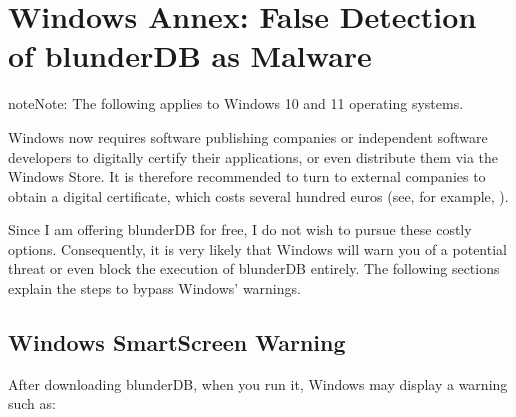 \documentclass[letterpaper,10pt,english]{sphinxmanual}
\begin{document}
\sphinxstepscope


\section{Windows Annex: False Detection of blunderDB as Malware}
\label{\detokenize{annexe_windows_securite:annexe-windows-detection-abusive-de-blunderdb-comme-logiciel-malveillant}}\label{\detokenize{annexe_windows_securite:annexe-windows-malware}}\label{\detokenize{annexe_windows_securite::doc}}
\begin{sphinxadmonition}{note}{Note:}
\sphinxAtStartPar
The following applies to Windows 10 and 11 operating systems.
\end{sphinxadmonition}

\sphinxAtStartPar
Windows now requires software publishing companies or independent software developers to digitally certify their applications, or even distribute them via the Windows Store. It is therefore recommended to turn to external companies to obtain a digital certificate, which costs several hundred euros (see, for example, ).

\sphinxAtStartPar
Since I am offering blunderDB for free, I do not wish to pursue these costly options. Consequently, it is very likely that Windows will warn you of a potential threat or even block the execution of blunderDB entirely. The following sections explain the steps to bypass Windows’ warnings.


\subsection{Windows SmartScreen Warning}
\label{\detokenize{annexe_windows_securite:avertissement-windows-smartscreen}}
\sphinxAtStartPar
After downloading blunderDB, when you run it, Windows may display a warning such as:

\begin{figure}[htbp]
\centering

\noindent{}
\end{figure}
\end{document}
